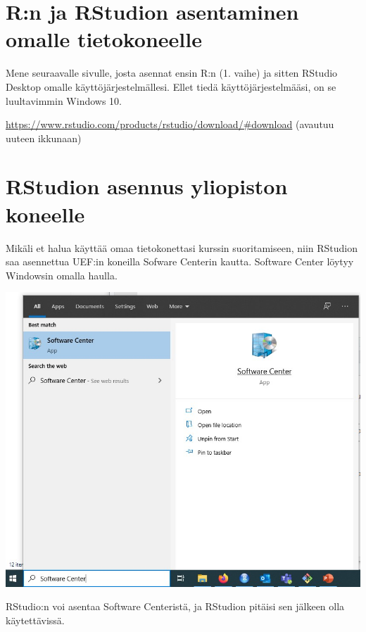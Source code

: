 \documentclass[
]{book}
\begin{document}
\hypertarget{rn-ja-rstudion-asentaminen-omalle-tietokoneelle}{%
\section*{R:n ja RStudion asentaminen omalle tietokoneelle}\label{rn-ja-rstudion-asentaminen-omalle-tietokoneelle}}

Mene seuraavalle sivulle, josta asennat ensin R:n (1. vaihe) ja sitten RStudio Desktop omalle käyttöjärjestelmällesi. Ellet tiedä käyttöjärjestelmääsi, on se luultavimmin Windows 10.

\url{https://www.rstudio.com/products/rstudio/download/\#download} (avautuu uuteen ikkunaan)

\hypertarget{rstudion-asennus-yliopiston-koneelle}{%
\section*{RStudion asennus yliopiston koneelle}\label{rstudion-asennus-yliopiston-koneelle}}

Mikäli et halua käyttää omaa tietokonettasi kurssin suoritamiseen, niin RStudion saa asennettua UEF:in koneilla Sofware Centerin kautta. Software Center löytyy Windowsin omalla haulla.

\includegraphics{files/00-start/software_center.jpg}

RStudio:n voi asentaa Software Centeristä, ja RStudion pitäisi sen jälkeen olla käytettävissä.
\end{document}
